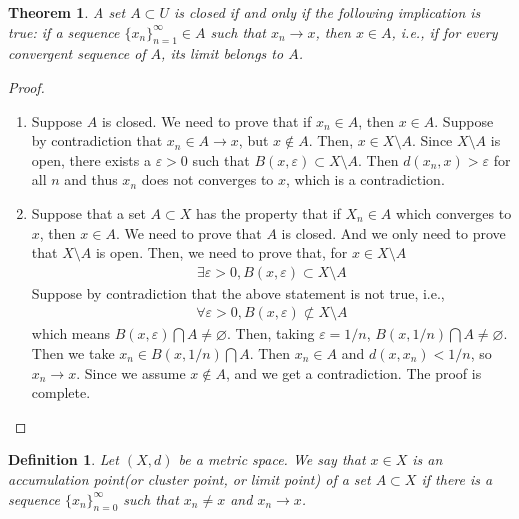 \documentclass[12pt,leqno]{amsart}
\newtheorem{definition}{Definition}[section]
\newtheorem{theorem}{Theorem}[section]
\theoremstyle{definition}
\numberwithin{equation}{subsection}
\begin{document}
\medskip

\begin{theorem}
A set $A\subset U$ is closed if and only if the following implication is true: if a sequence $\{x_n\}_{n=1}^\infty\in A$ such that $x_n\rightarrow x$, then $x\in A$, i.e., if for every convergent sequence of $A$, its limit belongs to $A$.
\end{theorem}
\begin{proof}
~\begin{enumerate}
    \item Suppose $A$ is closed. We need to prove that if $x_n \in A$, then $x\in A$. Suppose by contradiction that $x_n\in A \rightarrow x$, but $x\notin A$. Then, $x\in X\setminus A$. Since $X\setminus A$ is open, there exists a $\varepsilon > 0$ such that $B(x,\varepsilon) \subset X\setminus A$. Then $d(x_n,x) > \varepsilon$ for all $n$ and thus $x_n$ does not converges to $x$, which is a contradiction.
    \item Suppose that a set $A\subset X$ has the property that if $X_n \in A$ which converges to $x$, then $x\in A$. We need to prove that $A$ is closed. And we only need to prove that $X\setminus A$ is open. Then, we need to prove that, for $x\in X\setminus A$
    \begin{align*}
        \exists \varepsilon > 0, B(x, \varepsilon)\subset X\setminus A
    \end{align*}
    Suppose by contradiction that the above statement is not true, i.e., 
    \begin{align*}
        \forall \varepsilon > 0, B(x,\varepsilon)\not\subset X\setminus A
    \end{align*}
    which means $B(x,\varepsilon)\bigcap A \neq \varnothing$. Then, taking $\varepsilon = 1/n$, $B(x,1/n)\bigcap A \neq \varnothing$. Then we take $x_n\in B(x,1/n)\bigcap A$. Then $x_n\in A$ and $d(x,x_n) < 1/n$, so $x_n\rightarrow x$. Since we assume $x\notin A$, and we get a contradiction. The proof is complete.
\end{enumerate}
\end{proof}

\begin{definition}
Let $(X,d)$ be a metric space. We say that $x\in X$ is an accumulation point(or cluster point, or limit point) of a set $A\subset X$ if there is a sequence $\{x_n\}^\infty_{n=0}$ such that $x_n\neq x$ and $x_n \rightarrow x$.
\end{definition}

\medskip
\end{document}

